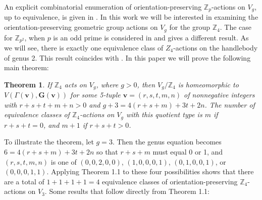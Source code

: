 \documentclass{amsart}
\newtheorem{theorem}{Theorem}[section]
\theoremstyle{definition}
\numberwithin{equation}{section}
\begin{document}

An explicit combinatorial enumeration of orientation-preserving $\mathbb{Z}_{p}$-actions on $V_g$, up to equivalence, is given in \cite{KM}. In this work we will be interested in examining the orientation-preserving geometric group actions on $V_g$ for the group $\mathbb{Z}_{4}$. The case for $\mathbb{Z}_{p^2}$, when $p$ is an odd prime is considered in \cite{JPL} and gives a different result. As we will see, there is exactly one equivalence class of $Z_4$-actions on the handlebody of genus 2. This result coincides with \cite{JK}. In this paper we will prove the following main theorem:









\begin{theorem}
If $\mathbb{Z}_4$ acts on $V_g$, where $g>0$, then $V_g/\mathbb{Z}_4$ is homeomorphic to $V(\Gamma({\mathbf{v}}),{\mathbf{G(v)}})$ for some 5-tuple ${\mathbf{v}}=(r,s,t,m,n)$ of nonnegative integers with $r+s+t+m+n>0$ and $g+3=4(r+s+m)+3t+2n$. The number of equivalence classes of $\mathbb{Z}_4$-actions on $V_g$ with this quotient type is $m$ if $r+s+t=0$, and $m+1$ if $r+s+t>0$.
\end{theorem}

To illustrate the theorem, let $g=3$. Then the genus equation becomes $6=4(r+s+m)+3t+2n$ so that $r+s+m$ must equal 0 or 1, and $(r,s,t,m,n)$ is one of $(0,0,2,0,0)$, $(1,0,0,0,1)$, $(0,1,0,0,1)$, or $(0,0,0,1,1)$. Applying Theorem 1.1 to these four possibilities shows that there are a total of $1+1+1+1=4$ equivalence classes of orientation-preserving $\mathbb{Z}_4$-actions on $V_3$. Some results that follow directly from Theorem 1.1:
\end{document}

